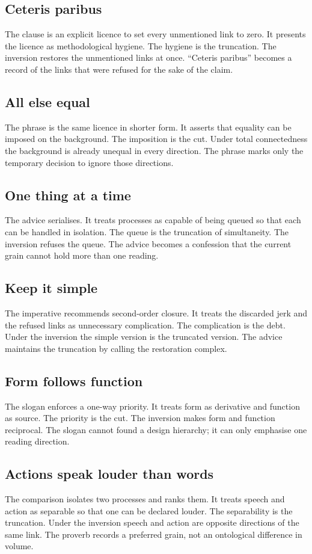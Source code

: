 \documentclass[11pt,a4paper]{article}
\begin{document}
\subsection{Ceteris paribus} The clause is an explicit licence to set every unmentioned link to zero. It presents the licence as methodological hygiene. The hygiene is the truncation. The inversion restores the unmentioned links at once. ``Ceteris paribus'' becomes a record of the links that were refused for the sake of the claim.

\subsection{All else equal} The phrase is the same licence in shorter form. It asserts that equality can be imposed on the background. The imposition is the cut. Under total connectedness the background is already unequal in every direction. The phrase marks only the temporary decision to ignore those directions.

\subsection{One thing at a time} The advice serialises. It treats processes as capable of being queued so that each can be handled in isolation. The queue is the truncation of simultaneity. The inversion refuses the queue. The advice becomes a confession that the current grain cannot hold more than one reading.

\subsection{Keep it simple} The imperative recommends second-order closure. It treats the discarded jerk and the refused links as unnecessary complication. The complication is the debt. Under the inversion the simple version is the truncated version. The advice maintains the truncation by calling the restoration complex.

\subsection{Form follows function} The slogan enforces a one-way priority. It treats form as derivative and function as source. The priority is the cut. The inversion makes form and function reciprocal. The slogan cannot found a design hierarchy; it can only emphasise one reading direction.

\subsection{Actions speak louder than words} The comparison isolates two processes and ranks them. It treats speech and action as separable so that one can be declared louder. The separability is the truncation. Under the inversion speech and action are opposite directions of the same link. The proverb records a preferred grain, not an ontological difference in volume.
\end{document}
